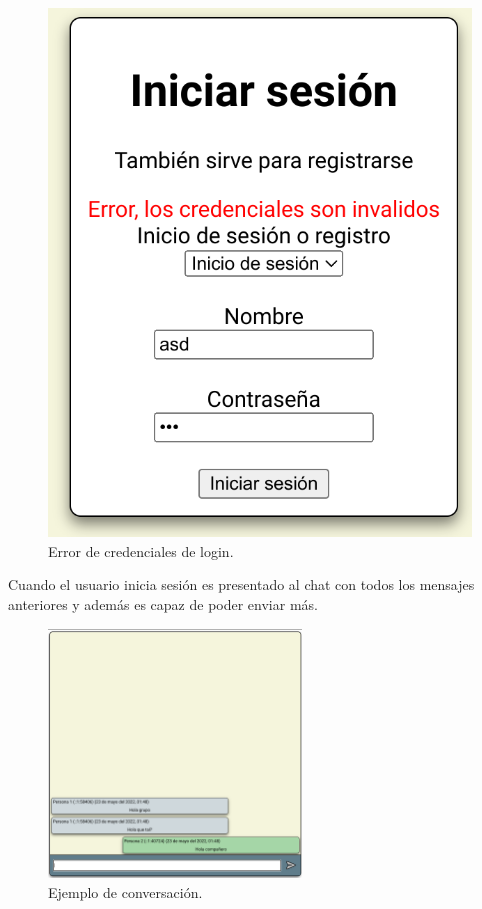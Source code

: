 \documentclass{article}
\begin{document}
\begin{figure}[H]
\begin{minipage}[H]{0.49\textwidth}
        \includegraphics[width=\textwidth]{images/errorlogin.png}
        \caption{Error de credenciales de login.}
    \end{minipage}
\end{figure}

Cuando el usuario inicia sesión es presentado al chat con todos los mensajes anteriores y además es capaz de poder enviar más.

\begin{figure}[H]
    \centering
    \includegraphics[width=0.6\textwidth]{images/chatmsg.png}
    \caption{Ejemplo de conversación.}
\end{figure}
\end{document}
